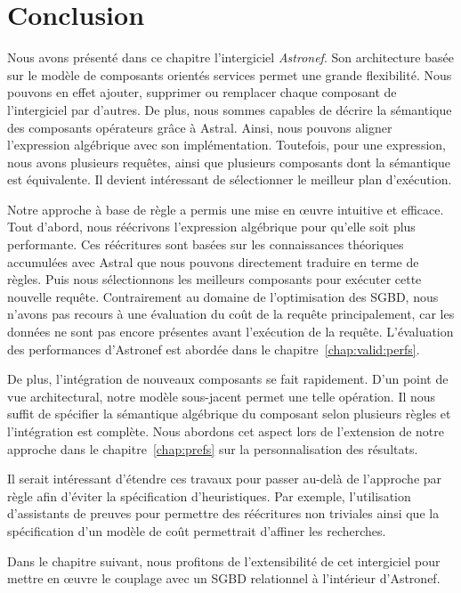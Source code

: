 \section{Conclusion}\label{sec:contrib:astronef:conclusion}
Nous avons présenté dans ce chapitre l'intergiciel \textit{Astronef}. Son architecture basée sur le modèle de composants orientés services permet une grande flexibilité. Nous pouvons en effet ajouter, supprimer ou remplacer chaque composant de l'intergiciel par d'autres. De plus, nous sommes capables de décrire la sémantique des composants opérateurs grâce à Astral. Ainsi, nous pouvons aligner l'expression algébrique avec son implémentation. Toutefois, pour une expression, nous avons plusieurs requêtes, ainsi que plusieurs composants dont la sémantique est équivalente. Il devient intéressant de sélectionner le meilleur plan d'exécution.

Notre approche à base de règle a permis une mise en œuvre intuitive et efficace. Tout d'abord, nous réécrivons l'expression algébrique pour qu'elle soit plus performante. Ces réécritures sont basées sur les connaissances théoriques accumulées avec Astral que nous pouvons directement traduire en terme de règles. Puis nous sélectionnons les meilleurs composants pour exécuter cette nouvelle requête. Contrairement au domaine de l'optimisation des SGBD, nous n'avons pas recours à une évaluation du coût de la requête principalement, car les données ne sont pas encore présentes avant l'exécution de la requête. L'évaluation des performances d'Astronef est abordée dans le chapitre~\ref{chap:valid:perfs}. 

De plus, l'intégration de nouveaux composants se fait rapidement. D'un point de vue architectural, notre modèle sous-jacent permet une telle opération. Il nous suffit de spécifier la sémantique algébrique du composant selon plusieurs règles et l'intégration est complète. Nous abordons cet aspect lors de l'extension de notre approche dans le chapitre~\ref{chap:prefs} sur la personnalisation des résultats.

Il serait intéressant d'étendre ces travaux pour passer au-delà de l'approche par règle afin d'éviter la spécification d'heuristiques. Par exemple, l'utilisation d'assistants de preuves pour permettre des réécritures non triviales ainsi que la spécification d'un modèle de coût permettrait d'affiner les recherches.

Dans le chapitre suivant, nous profitons de l'extensibilité de cet intergiciel pour mettre en œuvre le couplage avec un SGBD relationnel à l'intérieur d'Astronef.